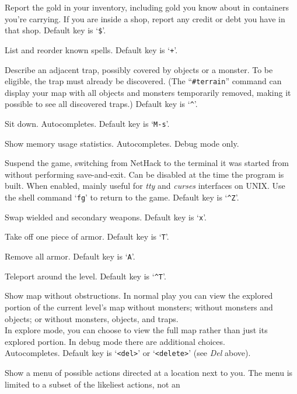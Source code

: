 Report the gold in your inventory, including gold you know about in
containers you're carrying.  If you are inside a shop, report any credit
or debt you have in that shop.
Default key is `{\tt \$}'.
\item[\tb{\#showspells}]
List and reorder known spells.
Default key is `{\tt +}'.
\item[\tb{\#showtrap}]
Describe an adjacent trap, possibly covered by objects or a monster.
To be eligible, the trap must already be discovered.
(The ``{\tt \#terrain}'' command can display your map with all objects and
monsters temporarily removed, making it possible to see all discovered
traps.)
Default key is `{\tt \^{}}'.
\item[\tb{\#sit}]
Sit down. Autocompletes. Default key is `{\tt M-s}'.
\item[\tb{\#stats}]
Show memory usage statistics.
Autocompletes.
Debug mode only.
\item[\tb{\#suspend}]
Suspend the game, switching from NetHack to the terminal it was started
from without performing save-and-exit.
Can be disabled at the time the program is built.
When enabled, mainly useful for {\it tty\/} and {\it curses\/} interfaces on
UNIX.
Use the shell command `{\tt fg}' to return to the game.
Default key is `{\tt \^{}Z}'.
\item[\tb{\#swap}]
Swap wielded and secondary weapons. Default key is `{\tt x}'.
\item[\tb{\#takeoff}]
Take off one piece of armor. Default key is `{\tt T}'.
\item[\tb{\#takeoffall}]
Remove all armor. Default key is `{\tt A}'.
\item[\tb{\#teleport}]
Teleport around the level. Default key is `{\tt \^{}T}'.
\item[\tb{\#terrain}]
Show map without obstructions.
In normal play you can view the explored portion of the current level's
map without monsters; without monsters and objects; or without monsters,
objects, and traps.\\
In explore mode, you can choose to view the full map rather than just
its explored portion.
In debug mode there are additional choices.\\
Autocompletes.
Default key is `{\tt <del>}' or `{\tt <delete>}' (see {\it Del\/} above).
\item[\tb{\#therecmdmenu}]
Show a menu of possible actions directed at a location next to you.
The menu is limited to a subset of the likeliest actions, not an
